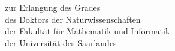 \begin{titlepage}
    \begin{addmargin}[-1cm]{-3cm}
    \begin{center}
        \large

        \hfill

        \vfill

        \begingroup
            \color{CTtitle}\spacedallcaps{\myTitle} \\ \bigskip
        \endgroup

        \spacedlowsmallcaps{\myName}

        \vfill

	    \\
	    \bigskip
	    zur  Erlangung  des  Grades\\
	    des  Doktors  der Naturwissenschaften\\
	    der Fakultät für Mathematik und Informatik\\
	    der Universität des Saarlandes
        \bigskip

        \myTime %

        \vfill

    \end{center}
  \end{addmargin}
\end{titlepage}
